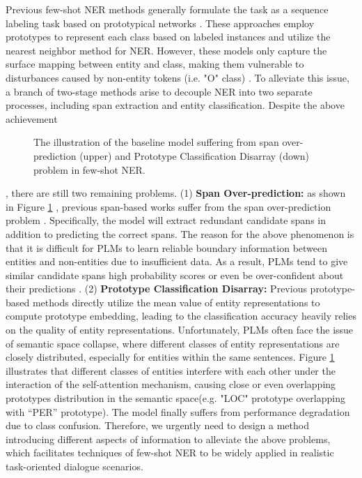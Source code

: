 \documentclass[sigconf,natbib=true,anonymous=False]{acmart}
\begin{document}
Previous few-shot NER methods \cite{yang2020simple,hou2020few,ziyadi2020example,das2021container,fritzler2019few,ma2022label} generally formulate the task as a sequence labeling task based on prototypical networks \cite{snell2017prototypical}. These approaches employ prototypes to represent each class based on labeled instances and utilize the nearest neighbor method for NER. However, these models only capture the surface mapping between entity and class, making them vulnerable to disturbances caused by non-entity tokens (i.e. "O" class) \cite{wang2021enhanced,shen2021locate}. To alleviate this issue, a branch of two-stage methods \cite{ma2022decomposed,wang2021enhanced,shen2021locate,wu2022propose} arise to decouple NER into two separate processes, including span extraction and entity classification. Despite the above achievement
\begin{figure}[t]
\centering


\vspace{-0.2cm} 
\caption{The illustration of the baseline model suffering from span over-prediction (upper) and Prototype Classification Disarray (down) problem in few-shot NER.}
\label{fig:intro}
\vspace{0.2cm} 
\end{figure}
, there are still two remaining problems. (1) \textbf{Span Over-prediction:} as shown in Figure \ref{fig:intro} , previous span-based works suffer from the span over-prediction problem \cite{zhu2022boundary,he2020contrastive}. Specifically, the model will extract redundant candidate spans in addition to predicting the correct spans. The reason for the above phenomenon is that it is difficult for PLMs to learn reliable boundary information between entities and non-entities due to insufficient data. As a result, PLMs tend to give similar candidate spans high probability scores or even be over-confident about their predictions \cite{guo2017calibration}.
(2) \textbf{Prototype Classification Disarray:} Previous prototype-based methods directly utilize the mean value of entity representations to compute prototype embedding, leading to the classification accuracy heavily relies on the quality of entity representations. Unfortunately, PLMs often face the issue of semantic space collapse, where different classes of entity representations are closely distributed, especially for entities within the same sentences. Figure \ref{fig:intro} illustrates that different classes of entities interfere with each other under the interaction of the self-attention mechanism, causing close or even overlapping prototypes distribution in the semantic space(e.g. "LOC" prototype overlapping with “PER” prototype). The model finally suffers from performance degradation due to class confusion. Therefore, we urgently need to design a method introducing different aspects of information to alleviate the above problems, which facilitates techniques of few-shot NER to be widely applied in realistic task-oriented dialogue scenarios.
\end{document}

